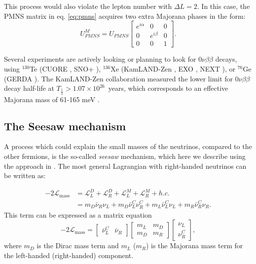 This process would also violate the lepton number with $\Delta L = 2$. In this case, the PMNS matrix in eq. \eqref{eq:pmns} acquires two extra Majorana phases in the form:
\begin{equation}
    U_{PMNS}^M = U_{PMNS} \begin{bmatrix}
    e^{i\alpha} & 0 & 0 \\
    0 & e^{i\beta} & 0 \\
    0 & 0 & 1
    \end{bmatrix}.
\end{equation}

Several experiments are actively looking or planning to look for $0\nu\beta\beta$ decays, using $^{130}$Te (CUORE \cite{Arnaboldi:2002du}, SNO+ \cite{Andringa:2015tza}), $^{136}$Xe (KamLAND-Zen \cite{KamLAND-Zen:2016pfg}, EXO \cite{Auger:2012ar}, NEXT \cite{Alvarez:2012flf}), or $^{76}$Ge (GERDA \cite{Agostini:2013mzu}). 
The KamLAND-Zen collaboration measured the lower limit for $0\nu\beta\beta$ decay half-life at $T_{\frac{1}{2}} > 1.07\times10^{26}$~years, which corresponds to an effective Majorana mass of 61-165 meV \cite{KamLAND-Zen:2016pfg}.

\subsection{The Seesaw mechanism}\label{sec:seesaw}
A process which could explain the small masses of the neutrinos, compared to the other fermions, is the so-called \emph{seesaw} mechanism, which here we describe using the approach in \cite{Grossman:2003eb}. 
The most general Lagrangian with right-handed neutrinos can be written as:

\begin{align}
    -2\mathcal{L}_{\mathrm{mass}} & = \mathcal{L}^D_L + \mathcal{L}^D_R + \mathcal{L}^M_L + \mathcal{L}^M_R + h.c. \\
    & = m_D \bar{\nu}_R \nu_L + m_D \bar{\nu}^C_L\nu^C_R + m_L\bar{\nu}_L^C\nu_L + m_R \bar{\nu}_R^C\nu_R.
\end{align}
This term can be expressed as a matrix equation 
\begin{equation}
    -2\mathcal{L_\mathrm{mass}} = \begin{bmatrix}
    \bar{\nu}_L^C & \bar{\nu}_R
    \end{bmatrix}\begin{bmatrix}
    m_L & m_D \\
    m_D & m_R
    \end{bmatrix}\begin{bmatrix}
    \nu_L \\ \nu_R^C
    \end{bmatrix},
\end{equation}
where $m_D$ is the Dirac mass term and $m_L$ ($m_R$) is the Majorana mass term for the left-handed (right-handed) component. 

